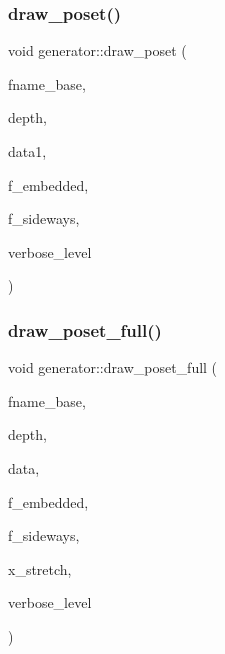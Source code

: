 \mbox{\label{classgenerator_aa4f99c75a86701ba85e514a294efdf3a}} 
\subsubsection{\texorpdfstring{draw\+\_\+poset()}{draw\_poset()}}
{\footnotesize\ttfamily void generator\+::draw\+\_\+poset (\begin{DoxyParamCaption}\item[{const \mbox{\hyperlink{galois_8h_ab6cc7b4aeb6ea31aba2b3fbfc83ff5e6}{B\+Y\+TE}} $\ast$}]{fname\+\_\+base,  }\item[{\mbox{\hyperlink{galois_8h_a09fddde158a3a20bd2dcadb609de11dc}{I\+NT}}}]{depth,  }\item[{\mbox{\hyperlink{galois_8h_a09fddde158a3a20bd2dcadb609de11dc}{I\+NT}}}]{data1,  }\item[{\mbox{\hyperlink{galois_8h_a09fddde158a3a20bd2dcadb609de11dc}{I\+NT}}}]{f\+\_\+embedded,  }\item[{\mbox{\hyperlink{galois_8h_a09fddde158a3a20bd2dcadb609de11dc}{I\+NT}}}]{f\+\_\+sideways,  }\item[{\mbox{\hyperlink{galois_8h_a09fddde158a3a20bd2dcadb609de11dc}{I\+NT}}}]{verbose\+\_\+level }\end{DoxyParamCaption})}

\mbox{\label{classgenerator_a6f7f90e50993905db31342536ac59d8c}} 
\subsubsection{\texorpdfstring{draw\+\_\+poset\+\_\+full()}{draw\_poset\_full()}}
{\footnotesize\ttfamily void generator\+::draw\+\_\+poset\+\_\+full (\begin{DoxyParamCaption}\item[{const \mbox{\hyperlink{galois_8h_ab6cc7b4aeb6ea31aba2b3fbfc83ff5e6}{B\+Y\+TE}} $\ast$}]{fname\+\_\+base,  }\item[{\mbox{\hyperlink{galois_8h_a09fddde158a3a20bd2dcadb609de11dc}{I\+NT}}}]{depth,  }\item[{\mbox{\hyperlink{galois_8h_a09fddde158a3a20bd2dcadb609de11dc}{I\+NT}}}]{data,  }\item[{\mbox{\hyperlink{galois_8h_a09fddde158a3a20bd2dcadb609de11dc}{I\+NT}}}]{f\+\_\+embedded,  }\item[{\mbox{\hyperlink{galois_8h_a09fddde158a3a20bd2dcadb609de11dc}{I\+NT}}}]{f\+\_\+sideways,  }\item[{double}]{x\+\_\+stretch,  }\item[{\mbox{\hyperlink{galois_8h_a09fddde158a3a20bd2dcadb609de11dc}{I\+NT}}}]{verbose\+\_\+level }\end{DoxyParamCaption})}

